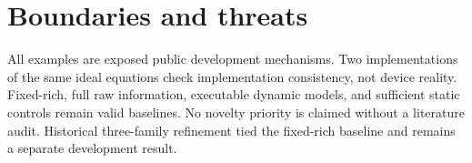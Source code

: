 \documentclass[10pt]{article}
\begin{document}
\section{Boundaries and threats}
All examples are exposed public development mechanisms. Two implementations of the same ideal equations check implementation consistency, not device reality. Fixed-rich, full raw information, executable dynamic models, and sufficient static controls remain valid baselines. No novelty priority is claimed without a literature audit. Historical three-family refinement tied the fixed-rich baseline and remains a separate development result.
\end{document}
